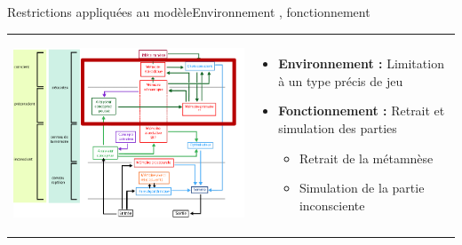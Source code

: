 \begin{frame}{Restrictions appliquées au modèle}{Environnement , fonctionnement}
\begin{tabular}{l l}
\begin{minipage}{0.6\textwidth}\begin{center}
\includegraphics[width=\textwidth]{img/analyse_generale/modele_restraint}
\end{center}\end{minipage} & \begin{minipage}{0.4\textwidth}
\begin{itemize}
  \item \textbf{Environnement : }Limitation à un type précis de jeu
  \item \textbf{Fonctionnement : }Retrait et simulation des parties
  \begin{itemize}
    \item Retrait de la métamnèse
    \item Simulation de la partie inconsciente
  \end{itemize}
\end{itemize}
\end{minipage}
\end{tabular}
\end{frame}
